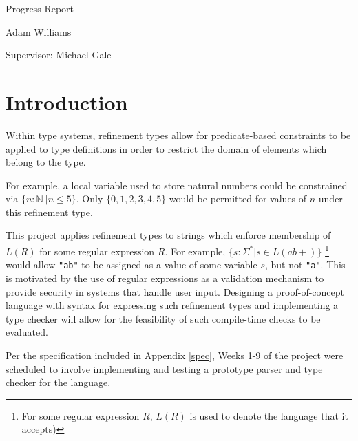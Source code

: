 \documentclass[a4paper]{article}
\begin{document}
\begin{titlepage}
    {\par}
    \vspace{1.25cm}
    \vspace{3.5cm}
    {\hspace{0.75cm}\Huge \sffamily Progress Report}
    \vspace{0.16cm}
    {\par}
    {\hspace{0.75cm}\large \sffamily Adam Williams}
    
    \vspace{0cm}
    {\par}
    {\hspace{0.75cm}\large \sffamily Supervisor: Michael Gale}
    \vfill
\end{titlepage}
\restoregeometry
\restorepagecolor

\tableofcontents
\pagebreak[5]
    
    \section{Introduction}
    
    Within type systems, refinement types allow for predicate-based constraints to be applied to type definitions in order to restrict the domain of elements which belong to the type.
    
    For example, a local variable used to store natural numbers could be constrained via $\{n: \mathbb{N}\ | n \leq 5\}$. Only $\{0, 1, 2, 3, 4, 5\}$ would be permitted for values of $n$ under this refinement type.
    
    This project applies refinement types to strings which enforce membership of $L(R)$ for some regular expression $R$. For example, $\{s: \Sigma^* | s \in L(ab+)\}$ \footnote{For some regular expression $R$, $L(R)$ is used to denote the language that it accepts)} would allow \texttt{"ab"} to be assigned as a value of some variable $s$, but not \texttt{"a"}. This is motivated by the use of regular expressions as a validation mechanism to provide security in systems that handle user input. Designing a proof-of-concept language with syntax for expressing such refinement types and implementing a type checker will allow for the feasibility of such compile-time checks to be evaluated.

    Per the specification included in Appendix \ref{spec}, Weeks 1-9 of the project were scheduled to involve implementing and testing a prototype parser and type checker for the language.
    
\end{document}
